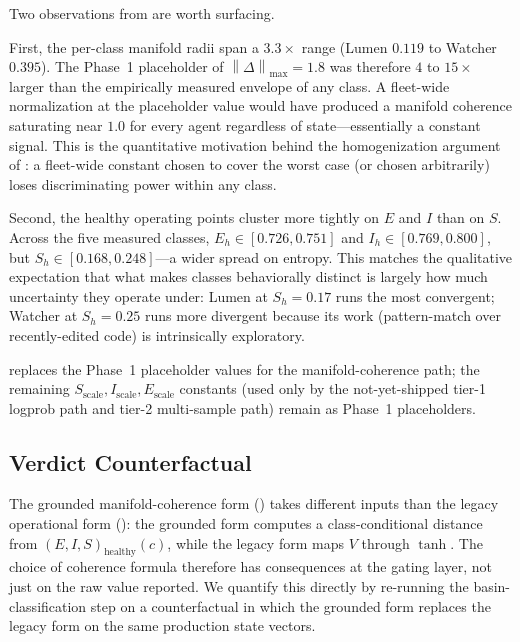 \documentclass[11pt,twocolumn]{article}
\newcommand{\norm}[1]{\left\lVert #1 \right\rVert}
\begin{document}
Two observations from  are worth surfacing.

First, the per-class manifold radii span a $3.3\times$ range
(Lumen $0.119$ to Watcher $0.395$). The Phase~1 placeholder of
$\norm{\Delta}_{\max} = 1.8$ was therefore $4$ to $15\times$
larger than the empirically measured envelope of any class. A
fleet-wide normalization at the placeholder value would have
produced a manifold coherence saturating near $1.0$ for every
agent regardless of state---essentially a constant signal. This
is the quantitative motivation behind the homogenization argument
of : a fleet-wide constant chosen to
cover the worst case (or chosen arbitrarily) loses discriminating
power within any class.

Second, the healthy operating points cluster more tightly on
$E$ and $I$ than on $S$. Across the five measured classes,
$E_h \in [0.726, 0.751]$ and $I_h \in [0.769, 0.800]$, but
$S_h \in [0.168, 0.248]$---a wider spread on entropy. This
matches the qualitative expectation that what makes classes
behaviorally distinct is largely how much uncertainty they
operate under: Lumen at $S_h = 0.17$ runs the most convergent;
Watcher at $S_h = 0.25$ runs more divergent because its work
(pattern-match over recently-edited code) is intrinsically
exploratory.

 replaces the Phase~1 placeholder values for
the manifold-coherence path; the remaining
$S_{\text{scale}}, I_{\text{scale}}, E_{\text{scale}}$ constants
(used only by the not-yet-shipped tier-1 logprob path and
tier-2 multi-sample path) remain as Phase~1 placeholders.

\subsection{Verdict Counterfactual}
\label{sec:verdict-counterfactual}

The grounded manifold-coherence form () takes
different inputs than the legacy operational form
(): the grounded form computes a
class-conditional distance from $(E,I,S)_{\text{healthy}}(c)$,
while the legacy form maps $V$ through $\tanh$. The choice of
coherence formula therefore has consequences at the gating layer,
not just on the raw value reported. We quantify this directly by
re-running the basin-classification step on a counterfactual in
which the grounded form replaces the legacy form on the same
production state vectors.
\end{document}
